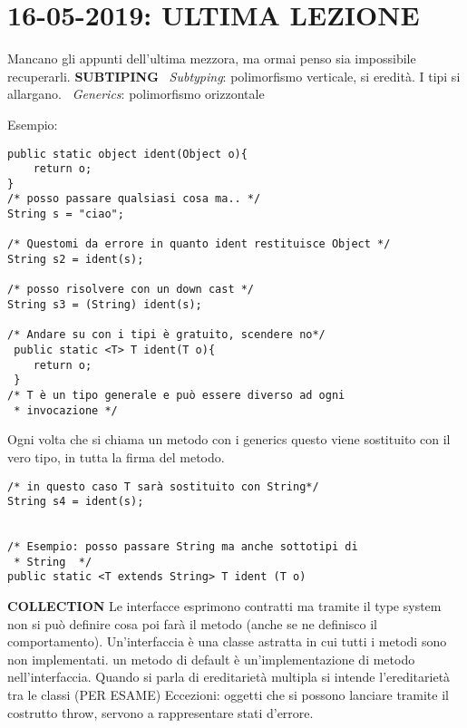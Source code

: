 \newpage
\section{16-05-2019: ULTIMA LEZIONE}
\noindent Mancano gli appunti dell'ultima mezzora, ma ormai penso sia impossibile recuperarli. \newline
\noindent \textbf{SUBTIPING} \newline
\textbullet\ \textit{Subtyping}: polimorfismo verticale, si eredità. I tipi si allargano. \newline
\textbullet\ \textit{Generics}: polimorfismo orizzontale \newline

 
\noindent Esempio:
\begin{lstlisting}
public static object ident(Object o){
	return o;
}
/* posso passare qualsiasi cosa ma.. */
String s = "ciao";

/* Questomi da errore in quanto ident restituisce Object */
String s2 = ident(s); 

/* posso risolvere con un down cast */
String s3 = (String) ident(s);

/* Andare su con i tipi è gratuito, scendere no*/
 public static <T> T ident(T o){
 	return o;
 }
/* T è un tipo generale e può essere diverso ad ogni
 * invocazione */
\end{lstlisting}


\noindent Ogni volta che si chiama un metodo con i generics questo viene sostituito con il vero tipo, in tutta la firma del metodo.
\begin{lstlisting}
/* in questo caso T sarà sostituito con String*/
String s4 = ident(s);


/* Esempio: posso passare String ma anche sottotipi di
 * String  */
public static <T extends String> T ident (T o)
\end{lstlisting}

\noindent \textbf{COLLECTION} \newline
Le interfacce esprimono contratti ma tramite il type system non si può definire cosa poi farà il metodo (anche se ne definisco il comportamento).\newline
Un'interfaccia è una classe astratta in cui tutti i metodi sono non implementati. \newline
un metodo di default è un'implementazione di metodo nell'interfaccia. \newline
Quando si parla di ereditarietà multipla si intende l'ereditarietà tra le classi (PER ESAME) \newline
Eccezioni: oggetti che si possono lanciare tramite il costrutto throw, servono a rappresentare stati d'errore.